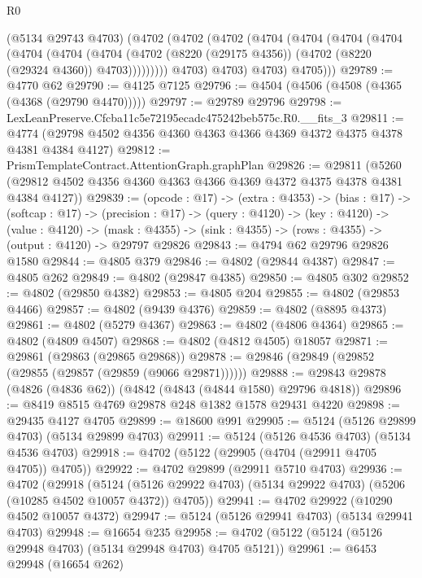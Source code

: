 \begin{lexlean}{R0}
\begin{coremodule}
          (@5134 @29743 @4703)
          (@4702
            (@4702
              (@4702
                (@4704
                  (@4704
                    (@4704
                      (@4704
                        (@4704
                          (@4704
                            (@4704
                              (@4702
                                (@8220 (@29175 @4356))
                                (@4702 (@8220 (@29324 @4360)) @4703)))))))))
                @4703)
              @4703)
            @4703)
          @4705)))
@29789 := @4770 @62
@29790 := @4125 @7125
@29796 := @4504 (@4506 (@4508 (@4365 (@4368 (@29790 @4470)))))
@29797 := @29789 @29796
@29798 := LexLeanPreserve.Cfcba11c5e72195ecadc475242beb575c.R0.__fits_3
@29811 := @4774 (@29798 @4502 @4356 @4360 @4363 @4366 @4369 @4372 @4375 @4378 @4381 @4384 @4127)
@29812 := PrismTemplateContract.AttentionGraph.graphPlan
@29826 := @29811
    (@5260 (@29812 @4502 @4356 @4360 @4363 @4366 @4369 @4372 @4375 @4378 @4381 @4384 @4127))
@29839 := (opcode : @17) ->
  (extra : @4353) ->
  (bias : @17) ->
  (softcap : @17) ->
  (precision : @17) ->
  (query : @4120) ->
  (key : @4120) ->
  (value : @4120) ->
  (mask : @4355) -> (sink : @4355) -> (rows : @4355) -> (output : @4120) -> @29797 @29826
@29843 := @4794 @62 @29796 @29826 @1580
@29844 := @4805 @379
@29846 := @4802 (@29844 @4387)
@29847 := @4805 @262
@29849 := @4802 (@29847 @4385)
@29850 := @4805 @302
@29852 := @4802 (@29850 @4382)
@29853 := @4805 @204
@29855 := @4802 (@29853 @4466)
@29857 := @4802 (@9439 @4376)
@29859 := @4802 (@8895 @4373)
@29861 := @4802 (@5279 @4367)
@29863 := @4802 (@4806 @4364)
@29865 := @4802 (@4809 @4507)
@29868 := @4802 (@4812 @4505) @18057
@29871 := @29861 (@29863 (@29865 @29868))
@29878 := @29846 (@29849 (@29852 (@29855 (@29857 (@29859 (@9066 @29871))))))
@29888 := @29843 @29878 (@4826 (@4836 @62)) (@4842 (@4843 (@4844 @1580) @29796 @4818))
@29896 := @8419 @8515 @4769 @29878 @248 @1382 @1578 @29431 @4220
@29898 := @29435 @4127 @4705
@29899 := @18600 @991
@29905 := @5124 (@5126 @29899 @4703) (@5134 @29899 @4703)
@29911 := @5124 (@5126 @4536 @4703) (@5134 @4536 @4703)
@29918 := @4702 (@5122 (@29905 (@4704 (@29911 @4705 @4705)) @4705))
@29922 := @4702 @29899 (@29911 @5710 @4703)
@29936 := @4702
    (@29918
      (@5124 (@5126 @29922 @4703) (@5134 @29922 @4703) (@5206 (@10285 @4502 @10057 @4372)) @4705))
@29941 := @4702 @29922 (@10290 @4502 @10057 @4372)
@29947 := @5124 (@5126 @29941 @4703) (@5134 @29941 @4703)
@29948 := @16654 @235
@29958 := @4702 (@5122 (@5124 (@5126 @29948 @4703) (@5134 @29948 @4703) @4705 @5121))
@29961 := @6453 @29948 (@16654 @262)

\end{coremodule}
\end{lexlean}
